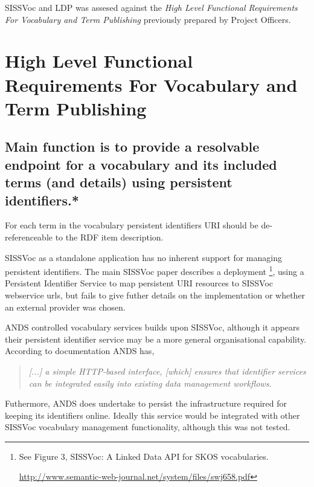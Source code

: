 \documentclass[10pt,a4paper]{article}
\newenvironment{italicquotes}
{\begin{quote}\itshape}
{\end{quote}}
\begin{document}
\begin{flushleft}
    \item[] SISSVoc and LDP was assesed against the \textit{High Level Functional
  Requirements For Vocabulary and Term Publishing} previously prepared by Project
  Officers.
    

\clearpage


\section { 
	High Level Functional Requirements For Vocabulary and Term Publishing
}

  \subsection{
   Main function is to provide a resolvable endpoint for a vocabulary and its
  included terms (and details) using persistent identifiers.* 
  }

  \item For each term in the vocabulary persistent identifiers {URI} should
  be de-referenceable to the RDF item description. 

  \item SISSVoc as a standalone application has no inherent support for managing persistent
  identifiers. The main SISSVoc paper describes a deployment \footnote{ See Figure 3,
  SISSVoc: A Linked Data API for SKOS vocabularies.

  \url{http://www.semantic-web-journal.net/system/files/swj658.pdf} }, using a
  Persistent Identifier Service to map persistent URI resources to SISSVoc
  webservice urls, but fails to give futher details on the implementation or
  whether an external provider was chosen. 

  \item ANDS controlled vocabulary services builds upon SISSVoc, although it appears
  their persistent identifier service may be a more general organisational capability. According to
  documentation ANDS has, 

  \begin{italicquotes} [...] a simple HTTP-based interface, [which] ensures that
  identifier services can be integrated easily into existing data management
  workflows.  \end{italicquotes}
  Futhermore, ANDS does undertake to persist the infrastructure required for
  keeping its identifiers online. Ideally this service would be integrated
  with other SISSVoc vocabulary management functionality, although this was not tested.


\end{flushleft}
\end{document}
